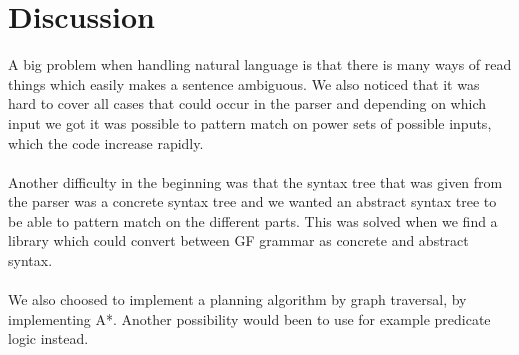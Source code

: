 \section{Discussion}
A big problem when handling natural language is that there is many ways of read things which easily makes a sentence ambiguous. We also noticed that it was hard to cover all cases that could occur in the parser and depending on which input we got it was possible to pattern match on power sets of possible inputs, which the code increase rapidly. \\\\
Another difficulty in the beginning was that the syntax tree that was given from the parser was a concrete syntax tree and we wanted an abstract syntax tree to be able to pattern match on the different parts. This was solved when we find a library which could convert between GF grammar as concrete and abstract syntax. \\\\
We also choosed to implement a planning algorithm by graph traversal, by implementing A*. Another possibility would been to use for example predicate logic instead. 

